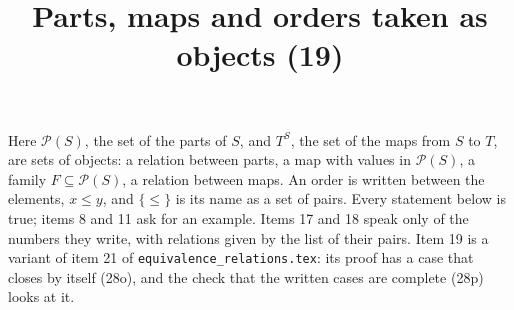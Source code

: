 \documentclass[11pt,a4paper]{article}
\title{Parts, maps and orders taken as objects (19)}
\author{}
\date{}
\begin{document}
\maketitle
Here $\mathcal{P}(S)$, the set of the parts of $S$, and $T^{S}$, the set of the maps from $S$ to $T$, are sets of objects: a relation between parts, a map with values in $\mathcal{P}(S)$, a family $F \subseteq \mathcal{P}(S)$, a relation between maps. An order is written between the elements, $x \le y$, and $\{\le\}$ is its name as a set of pairs. Every statement below is true; items 8 and 11 ask for an example. Items 17 and 18 speak only of the numbers they write, with relations given by the list of their pairs. Item 19 is a variant of item 21 of \texttt{equivalence\_relations.tex}: its proof has a case that closes by itself (28o), and the check that the written cases are complete (28p) looks at it.
\end{document}

